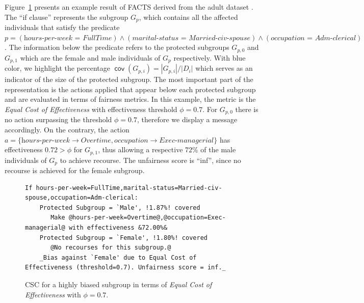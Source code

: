 \documentclass{article}
\DeclareMathOperator{\cov}{\mathsf{cov}}
\begin{document}
Figure~\ref{fig-example} presents an example result of FACTS derived from the adult dataset \cite{Bache+Lichman:2013}. The ``if clause'' represents the subgroup $G_p$, which contains all the affected individuals that \mbox{satisfy} the predicate
$p=(\textit{hours-per-week = FullTime}) \land (\textit{marital-status = Married-civ-spouse}) \land (\textit{occupation = Adm-clerical})$. The information below the predicate refers to the protected subgroups $G_{p,0}$ and $G_{p,1}$ which are the female and male individuals of $G_{p}$ respectively. With blue color, we highlight the percentage $\cov(G_{p,i})=|G_{p,i}|/|D_{i}|$ which serves as an indicator of the size of the protected subgroup. The most important part of the representation is the actions applied that appear below each protected subgroup and are evaluated in terms of fairness metrics. In this example, the metric is the \textit{Equal Cost of Effectiveness} with effectiveness threshold $\phi=0.7$. For $G_{p,0}$ there is no action surpassing the threshold $\phi=0.7$, therefore we display a message accordingly. On the contrary, the action $a = \{\textit{hours-per-week} \to \textit{Overtime}, \textit{occupation} \to \textit{Exec-managerial} \}$ has
effectiveness $0.72> \phi$ for $G_{p,1}$, thus allowing a respective $72\%$ of the male individuals of $G_{p}$ to achieve recourse.
The unfairness score is ``inf'', since no recourse is achieved for the female subgroup.



\begin{figure}[ht]
\centering
\begin{minipage}{1\linewidth}
\begin{lstlisting}[style = base]
If hours-per-week=FullTime,marital-status=Married-civ-spouse,occupation=Adm-clerical:
    Protected Subgroup = `Male', !1.87%! covered
       Make @hours-per-week=Overtime@,@occupation=Exec-managerial@ with effectiveness &72.00%&
    Protected Subgroup = `Female', !1.80%! covered
       @No recourses for this subgroup.@
    _Bias against `Female' due to Equal Cost of Effectiveness (threshold=0.7). Unfairness score = inf._
\end{lstlisting}
\end{minipage}
\caption{CSC for a highly biased subgroup in terms of \textit{Equal Cost of Effectiveness} with $\phi=0.7$. }
\label{fig-example}
\end{figure}
\end{document}
